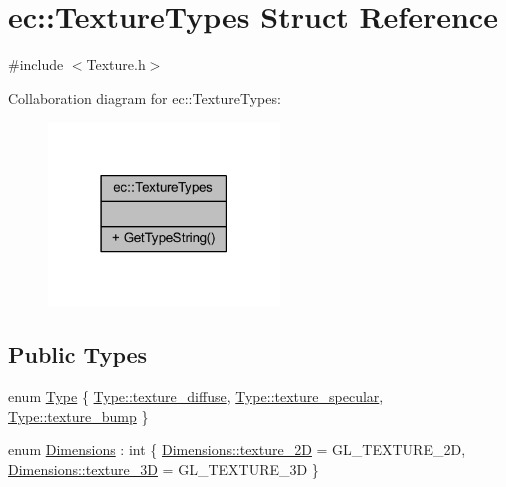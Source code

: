\hypertarget{structec_1_1_texture_types}{}\section{ec\+:\+:Texture\+Types Struct Reference}
\label{structec_1_1_texture_types}


{\ttfamily \#include $<$Texture.\+h$>$}



Collaboration diagram for ec\+:\+:Texture\+Types\+:\nopagebreak
\begin{figure}[H]
\begin{center}
\leavevmode
\includegraphics[width=174pt]{structec_1_1_texture_types__coll__graph}
\end{center}
\end{figure}
\subsection*{Public Types}
\begin{DoxyCompactItemize}
\item 
enum \mbox{\hyperlink{structec_1_1_texture_types_aff67825b98dd1edd7e4783350e866202}{Type}} \{ \mbox{\hyperlink{structec_1_1_texture_types_aff67825b98dd1edd7e4783350e866202a14537624b53e4f7ea1ed6da9d69689bd}{Type\+::texture\+\_\+diffuse}}, 
\mbox{\hyperlink{structec_1_1_texture_types_aff67825b98dd1edd7e4783350e866202a15de69baae1c21be50ddee302cc11949}{Type\+::texture\+\_\+specular}}, 
\mbox{\hyperlink{structec_1_1_texture_types_aff67825b98dd1edd7e4783350e866202a700e2ecc89c80e856d64e370ea3f13af}{Type\+::texture\+\_\+bump}}
 \}
\item 
enum \mbox{\hyperlink{structec_1_1_texture_types_aa9ef510185cfe61d20918eb0b2c13501}{Dimensions}} \+: int \{ \mbox{\hyperlink{structec_1_1_texture_types_aa9ef510185cfe61d20918eb0b2c13501af0108ea0594413a08d9ec573b6d7dfe4}{Dimensions\+::texture\+\_\+2D}} = G\+L\+\_\+\+T\+E\+X\+T\+U\+R\+E\+\_\+2D, 
\mbox{\hyperlink{structec_1_1_texture_types_aa9ef510185cfe61d20918eb0b2c13501a276d2570f9586e611390e80162e19d81}{Dimensions\+::texture\+\_\+3D}} = G\+L\+\_\+\+T\+E\+X\+T\+U\+R\+E\+\_\+3D
 \}
\end{DoxyCompactItemize}
